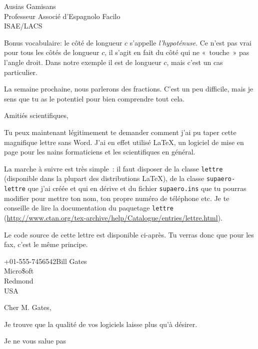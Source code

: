 \documentclass[pdftex,a4paper,12pt,origdate]{supaero-lettre}
\begin{document}
\begin{letter}{Ausias Gamisans\\ Professeur Associé d'Espagnolo
    Facilo\\ISAE/LACS}

Bonus vocabulaire: le côté de longueur $c$ s'appelle
\emph{l'hypoténuse}. Ce n'est pas vrai pour tous les côtés de longueur
$c$, il s'agit en fait du côté qui ne «~touche~» pas l'angle
droit. Dans notre exemple il est de longueur $c$, mais c'est un cas
particulier.

La semaine prochaine, nous parlerons des fractions. C'est un peu
difficile, mais je sens que tu as le potentiel pour bien comprendre
tout cela.

\closing{Amitiés scientifiques,}


\vspace{2cm}

Tu peux maintenant légitimement te demander comment j'ai pu taper
cette magnifique lettre sans Word. J'ai en effet utilisé \LaTeX, un
logiciel de mise en page pour les nains formaticiens et les
scientifiques en général.

La marche à suivre est très simple~: il faut disposer de la classe
\texttt{lettre} (disponible dans la plupart des distributions \LaTeX),
de la classe \texttt{supaero-lettre} que j'ai créée et qui en dérive
et du fichier \texttt{supaero.ins} que tu pourras modifier pour mettre
ton nom, ton propre numéro de téléphone etc. Je te conseille de lire
la documentation du paquetage \texttt{lettre}
(\url{http://www.ctan.org/tex-archive/help/Catalogue/entries/lettre.html}).

Le code source de cette lettre est disponible ci-après. Tu verras donc
que pour les fax, c'est le même principe.



\end{letter}

\begin{telefax}{+01-555-7456542}{Bill Gates\\Micro\$oft\\Redmond\\USA}
  


\opening{Cher M. Gates,}

Je trouve que la qualité de vos logiciels laisse plus qu'à désirer.

\closing{Je ne vous salue pas}

\end{telefax}
\end{document}
